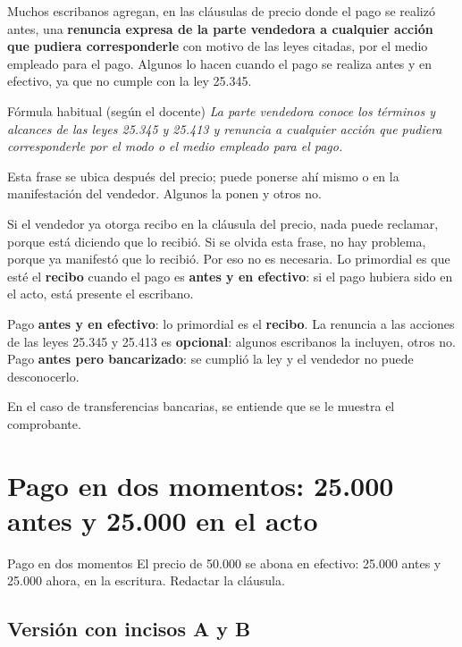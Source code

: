 \documentclass[12pt,oneside]{book}
\begin{document}
Muchos escribanos agregan, en las cláusulas de precio donde el pago se realizó antes, una \textbf{renuncia expresa de la parte vendedora a cualquier acción que pudiera corresponderle} con motivo de las leyes citadas, por el medio empleado para el pago. Algunos lo hacen cuando el pago se realiza antes y en efectivo, ya que no cumple con la ley 25.345.

\begin{example}{Fórmula habitual (según el docente)}
\textit{La parte vendedora conoce los términos y alcances de las leyes 25.345 y 25.413 y renuncia a cualquier acción que pudiera corresponderle por el modo o el medio empleado para el pago.}
\end{example}

Esta frase se ubica después del precio; puede ponerse ahí mismo o en la manifestación del vendedor. Algunos la ponen y otros no.

Si el vendedor ya otorga recibo en la cláusula del precio, nada puede reclamar, porque está diciendo que lo recibió. Si se olvida esta frase, no hay problema, porque ya manifestó que lo recibió. Por eso no es necesaria. Lo primordial es que esté el \textbf{recibo} cuando el pago es \textbf{antes y en efectivo}: si el pago hubiera sido en el acto, está presente el escribano.

\begin{important}
Pago \textbf{antes y en efectivo}: lo primordial es el \textbf{recibo}. La renuncia a las acciones de las leyes 25.345 y 25.413 es \textbf{opcional}: algunos escribanos la incluyen, otros no. Pago \textbf{antes pero bancarizado}: se cumplió la ley y el vendedor no puede desconocerlo.
\end{important}

En el caso de transferencias bancarias, se entiende que se le muestra el comprobante.

\section{Pago en dos momentos: 25.000 antes y 25.000 en el acto}

\begin{exercise}{Pago en dos momentos}
El precio de 50.000 se abona en efectivo: 25.000 antes y 25.000 ahora, en la escritura. Redactar la cláusula.
\end{exercise}

\subsection{Versión con incisos A y B}
\end{document}
